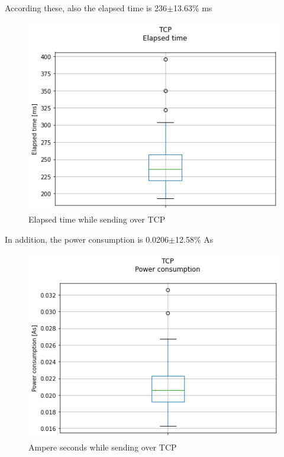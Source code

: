 According these, also the elapsed time is 236$\pm$13.63\% ms
\linebreak
\begin{figure}[H]
\centering
\includegraphics[width = 0.7 \linewidth]{fig/udp_tcp/tcp_boxplot_time.png}
\caption{Elapsed time while sending over TCP}
\label{fig:tcp_boxplot_time}
\end{figure}
In addition, the power consumption is 0.0206$\pm$12.58\% As
\linebreak
\begin{figure}[H]
\centering
\includegraphics[width = 0.7 \linewidth]{fig/udp_tcp/tcp_boxplot_As.png}
\caption{Ampere seconds while sending over TCP}
\label{fig:tcp_boxplot_As}
\end{figure}
